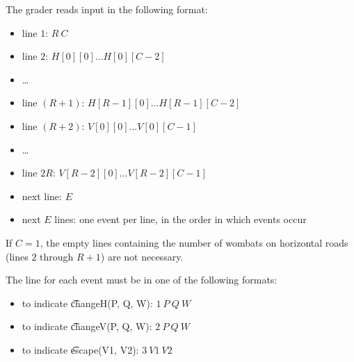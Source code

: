 The grader reads input in the following format:
\begin{itemize}
\item line $1$: $R\ C$
\item line $2$: $H[0][0]\dots H[0][C­-2]$
\item \dots
\item line $(R + 1)$: $H[R­-1][0] \dots H[R­-1][C­-2]$
\item line $(R + 2)$: $V[0][0] \dots V[0][C­-1]$
\item \dots
\item line $2R$: $V[R­-2][0] \dots V[R­-2][C­-1]$
\item next line: $E$
\item next $E$ lines: one event per line, in the order in which events occur
\end{itemize}

If $C = 1$, the empty lines containing the number of wombats on horizontal roads (lines $2$ through $R + 1$) are not necessary.

The line for each event must be in one of the following formats:
\begin{itemize}
\item to indicate \t{changeH(P, Q, W)}: $1\ P\ Q\ W$
\item to indicate \t{changeV(P, Q, W)}: $2\ P\ Q\ W$
\item to indicate \t{escape(V1, V2)}: $3\ V1\ V2$
\end{itemize}
